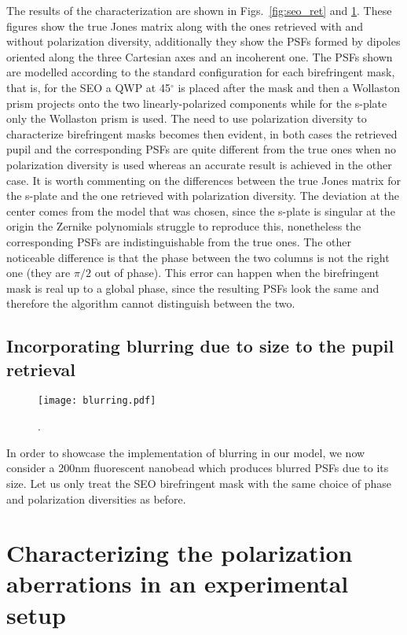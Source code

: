\documentclass[reprint,aps,pra,superscriptaddress,
amsmath,amssymb]{revtex4-1}
\begin{document}
The results of the characterization are shown in Figs.~\ref{fig:seo_ret} 
and \ref{fig:qp_ret}. These figures show the true Jones matrix along with the
ones retrieved with and without polarization diversity, additionally they show the
PSFs formed by dipoles oriented along the three Cartesian axes and an incoherent one. 
The PSFs shown are modelled according to the standard configuration for each 
birefringent mask, that is, for the SEO a QWP at 45${}^\circ$ is placed after the mask 
and then a Wollaston prism projects onto the two linearly-polarized components while 
for the s-plate only the Wollaston prism is used. The need to use polarization diversity
to characterize birefringent masks becomes then evident, in both cases the retrieved
pupil and the corresponding PSFs are quite different from the true ones when no
polarization diversity is used whereas an accurate result is achieved in the other case.
It is worth commenting on the differences between the true Jones matrix for the s-plate 
and the one retrieved with polarization diversity. The deviation at the center comes 
from the model that was chosen, since the s-plate is singular at the origin the Zernike
polynomials struggle to reproduce this, nonetheless the corresponding PSFs are 
indistinguishable from the true ones. The other noticeable difference is that the phase
between the two columns is not the right one (they are $\pi/2$ out of phase). 
This error can happen when the birefringent mask is real up to a global phase, since the
resulting PSFs look the same and therefore the algorithm cannot distinguish between the 
two.


\subsection{Incorporating blurring due to size to the pupil retrieval}

\begin{figure}
  \centering
  \texttt{[image: blurring.pdf]}
  \caption{\label{fig:qp_ret} . }
\end{figure}

In order to showcase the implementation of blurring in our model, we now consider a 
200nm fluorescent nanobead which produces blurred PSFs due to its size. Let us only treat 
the SEO birefringent mask with the same choice of phase and polarization 
diversities as before.


\section{Characterizing the polarization aberrations in an experimental
setup}
\end{document}
